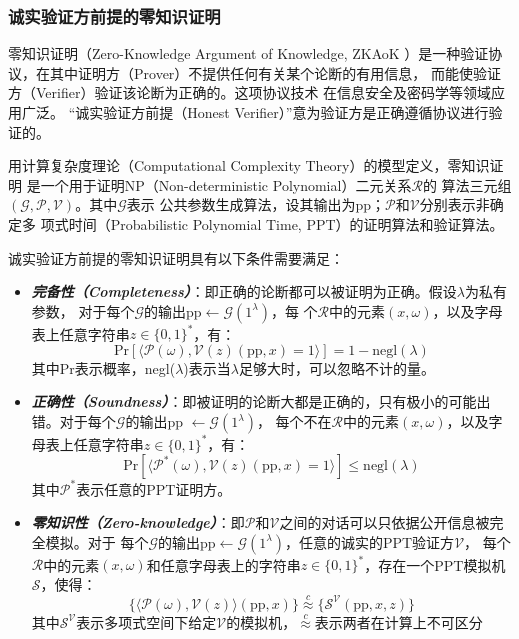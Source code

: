 \documentclass[zihao=-4]{ctexart}
\begin{document}
\begin{spacing}{1.5}
\subsubsection{诚实验证方前提的零知识证明}
零知识证明（Zero-Knowledge Argument of Knowledge, ZKAoK
）是一种验证协议，在其中证明方（Prover）不提供任何有关某个论断的有用信息，
而能使验证方（Verifier）验证该论断为正确的。这项协议技术
在信息安全及密码学等领域应用广泛。
“诚实验证方前提（Honest Verifier）”意为验证方是正确遵循协议进行验证的。\par
用计算复杂度理论（Computational Complexity Theory）的模型定义，零知识证明
是一个用于证明NP（Non-deterministic Polynomial）二元关系$\mathcal{R}$的
算法三元组$(\mathcal{G}, \mathcal{P}, \mathcal{V})$。其中$\mathcal{G}$表示
公共参数生成算法，设其输出为pp；$\mathcal{P}$和$\mathcal{V}$分别表示非确定多
项式时间（Probabilistic Polynomial Time, PPT）的证明算法和验证算法。\par
诚实验证方前提的零知识证明具有以下条件需要满足：
\begin{itemize}
  \item \textbf{\emph{完备性（Completeness）}}：即正确的论断都可以被证明为正确。假设$\lambda$为私有参数，
      对于每个$\mathcal{G}$的输出pp$\leftarrow\mathcal{G}(1^{\lambda})$，每
      个$\mathcal{R}$中的元素$(x,\omega)$，以及字母表上任意字符串$z\in\{0,1\}^*$，有：
      \[\text{Pr}[\langle \mathcal{P}({\omega}),\mathcal{V}(z)(\text{pp},x)=1\rangle]=1-\text{negl}(\lambda)\]
      其中Pr表示概率，negl($\lambda$)表示当$\lambda$足够大时，可以忽略不计的量。
  \item \textbf{\emph{正确性（Soundness）}}：即被证明的论断大都是正确的，只有极小的可能出错。对于每个$\mathcal{G}$的输出pp
      $\leftarrow\mathcal{G}(1^{\lambda})$，
      每个不在$\mathcal{R}$中的元素$(x,\omega)$，以及字母表上任意字符串$z\in\{0,1\}^*$，有：
      \[\text{Pr}[\langle \mathcal{P}^*({\omega}),\mathcal{V}(z)(\text{pp},x)=1\rangle]\le\text{negl}(\lambda)\]
      其中$\mathcal{P}^*$表示任意的PPT证明方。
  \item \textbf{\emph{零知识性（Zero-knowledge）}}：即$\mathcal{P}$和$\mathcal{V}$之间的对话可以只依据公开信息被完全模拟。对于
      每个$\mathcal{G}$的输出pp$\leftarrow\mathcal{G}(1^{\lambda})$，任意的诚实的PPT验证方$\mathcal{V}$，
      每个$\mathcal{R}$中的元素$(x,\omega)$和任意字母表上的字符串$z\in\{0,1\}^*$，存在一个PPT模拟机$\mathcal{S}$，使得：
      \[\{\langle \mathcal{P}(\omega),\mathcal{V}(z)\rangle(\text{pp},x)\}\overset{c}{\approx}\{\mathcal{S}^{\mathcal{V}}(\text{pp},x,z)\}\]
      其中$\mathcal{S}^{\mathcal{V}}$表示多项式空间下给定$\mathcal{V}$的模拟机，$\overset{c}{\approx}$表示两者在计算上不可区分

\end{itemize}
\end{spacing}
\end{document}
